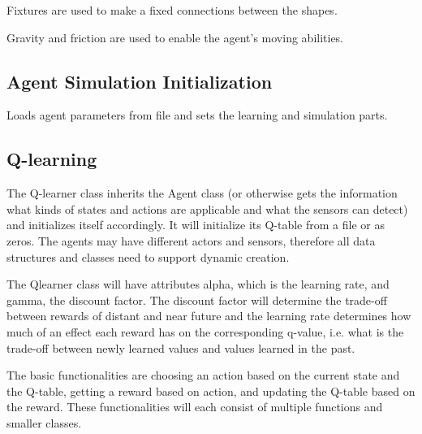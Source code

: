 \documentclass{article}
\begin{document}
Fixtures are used to make a fixed connections between the shapes.

Gravity and friction are used to enable the agent's moving abilities.

\subsection{Agent Simulation Initialization}
Loads agent parameters from file and sets the learning and simulation parts.


\subsection{Q-learning}
The Q-learner class inherits the Agent class (or otherwise gets the information
what kinds of states and actions are applicable and what the sensors can detect)
and initializes itself accordingly. It will initialize its Q-table from a file
or as zeros. The agents may have different actors and sensors,
therefore all data structures and classes
need to support dynamic creation.

The Qlearner class will have attributes alpha, which is the learning rate,
and gamma, the discount factor. The discount factor will determine the trade-off
between rewards of distant and near future and the learning rate determines how
much of an effect each reward has on the corresponding q-value, i.e. what is the
trade-off between newly learned values and values learned in the past.

The basic functionalities are choosing an action based on the current state and
the Q-table, getting a reward based on
action, and updating the Q-table based on
the reward. These functionalities will each consist of multiple functions and
smaller classes.
\end{document}
